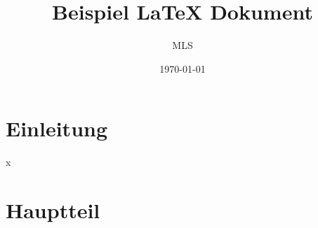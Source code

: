 \documentclass{article}
\title{Beispiel LaTeX Dokument}
\author{MLS}
\date{\today}
\begin{document}
\maketitle

\section{Einleitung}
\lipsum[1-2] %
x
\section{Hauptteil}
\lipsum[3-4] %
\end{document}
